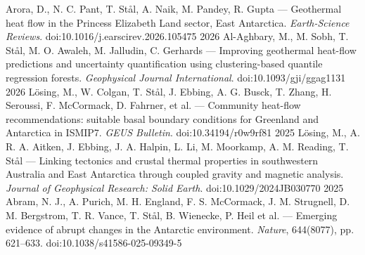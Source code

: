 \documentclass[11pt, a4paper]{cvClass}
\begin{document}
\begin{cvhonors}
    {Arora, D., N. C. Pant, T. Stål, A. Naik, M. Pandey, R. Gupta — Geothermal heat flow in the Princess Elizabeth Land sector, East Antarctica. \textit{Earth-Science Reviews}. doi:10.1016/j.earscirev.2026.105475}
    {}
    {}
  \cvhonor
    {2026}
    {Al-Aghbary, M., M. Sobh, T. Stål, M. O. Awaleh, M. Jalludin, C. Gerhards — Improving geothermal heat-flow predictions and uncertainty quantification using clustering-based quantile regression forests. \textit{Geophysical Journal International}. doi:10.1093/gji/ggag1131}
    {}
    {}
  \cvhonor
    {2026}
    {Lösing, M., W. Colgan, T. Stål, J. Ebbing, A. G. Busck, T. Zhang, H. Seroussi, F. McCormack, D. Fahrner, et al. — Community heat-flow recommendations: suitable basal boundary conditions for Greenland and Antarctica in ISMIP7. \textit{GEUS Bulletin}. doi:10.34194/r0w9rf81}
    {}
    {}
  \cvhonor
    {2025}
    {Lösing, M., A. R. A. Aitken, J. Ebbing, J. A. Halpin, L. Li, M. Moorkamp, A. M. Reading, T. Stål — Linking tectonics and crustal thermal properties in southwestern Australia and East Antarctica through coupled gravity and magnetic analysis. \textit{Journal of Geophysical Research: Solid Earth}. doi:10.1029/2024JB030770}
    {}
    {}
  \cvhonor
    {2025}
    {Abram, N. J., A. Purich, M. H. England, F. S. McCormack, J. M. Strugnell, D. M. Bergstrom, T. R. Vance, T. Stål, B. Wienecke, P. Heil et al. — Emerging evidence of abrupt changes in the Antarctic environment. \textit{Nature}, 644(8077), pp. 621–633. doi:10.1038/s41586-025-09349-5}
    {}
    {}
    \end{cvhonors}
\end{document}
